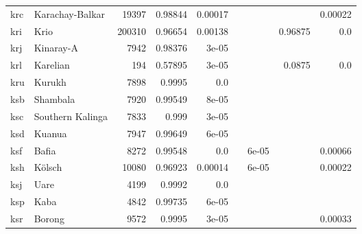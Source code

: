 \documentclass[11pt]{article}
\begin{document}
\begin{table*}[h]
{\begin{tabular}{llrrrrrrr}
krc         & Karachay-Balkar         & 19397         & 0.98844         & 0.00017         &          &          &          & 0.00022         \\

kri         & Krio         & 200310         & 0.96654         & 0.00138         &          &          & 0.96875         & 0.0         \\

krj         & Kinaray-A         & 7942         & 0.98376         & 3e-05         &          &          &          &          \\

krl         & Karelian         & 194         & 0.57895         & 3e-05         &          &          & 0.0875         & 0.0         \\

kru         & Kurukh         & 7898         & 0.9995         & 0.0         &          &          &          &          \\

ksb         & Shambala         & 7920         & 0.99549         & 8e-05         &          &          &          &          \\

ksc         & Southern Kalinga         & 7833         & 0.999         & 3e-05         &          &          &          &          \\

ksd         & Kuanua         & 7947         & 0.99649         & 6e-05         &          &          &          &          \\

ksf         & Bafia         & 8272         & 0.99548         & 0.0         &          & 6e-05         &          & 0.00066         \\

ksh         & Kölsch         & 10080         & 0.96923         & 0.00014         &          & 6e-05         &          & 0.00022         \\

ksj         & Uare         & 4199         & 0.9992         & 0.0         &          &          &          &          \\

ksp         & Kaba         & 4842         & 0.99735         & 6e-05         &          &          &          &          \\

ksr         & Borong         & 9572         & 0.9995         & 3e-05         &          &          &          & 0.00033         \\


\end{tabular}}
\end{table*}
\end{document}
